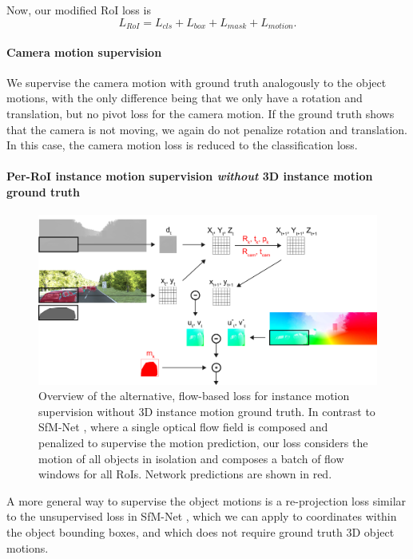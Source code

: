 Now, our modified RoI loss is
\begin{equation}
L_{RoI} = L_{cls} + L_{box} + L_{mask} + L_{motion}.
\end{equation}

\paragraph{Camera motion supervision}
We supervise the camera motion with ground truth analogously to the
object motions, with the only difference being that we only have
a rotation and translation, but no pivot loss for the camera motion.
If the ground truth shows that the camera is not moving, we again do not
penalize rotation and translation. In this case, the camera motion loss is reduced to the
classification loss.

\paragraph{Per-RoI instance motion supervision \emph{without} 3D instance motion ground truth}
\begin{figure}[t]
  \centering
  \includegraphics[width=\textwidth]{figures/flow_loss}
\caption{
Overview of the alternative, flow-based loss for instance motion
supervision without 3D instance motion ground truth.
In contrast to SfM-Net \cite{SfmNet}, where a single optical flow field is
composed and penalized to supervise the motion prediction, our loss considers
the motion of all objects in isolation and composes a batch of flow windows
for all RoIs. Network predictions are shown in red.
}
\label{figure:flow_loss}
\end{figure}

A more general way to supervise the object motions is a re-projection
loss similar to the unsupervised loss in SfM-Net \cite{SfmNet},
which we can apply to coordinates within the object bounding boxes,
and which does not require ground truth 3D object motions.

